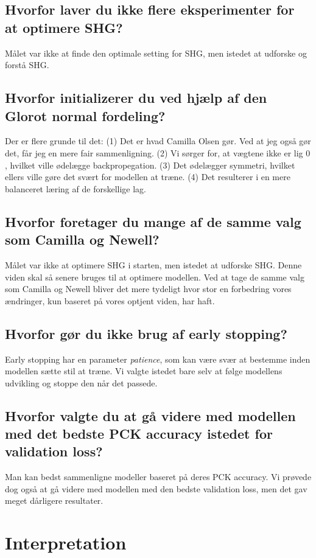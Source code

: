 \documentclass[a4paper]{article}
\begin{document}
\subsection{Hvorfor laver du ikke flere eksperimenter for at optimere SHG?}
Målet var ikke at finde den optimale setting for SHG, men istedet at udforske og forstå SHG. 

\subsection{Hvorfor initializerer du ved hjælp af den Glorot normal fordeling?}
Der er flere grunde til det: (1) Det er hvad Camilla Olsen gør. Ved at jeg også gør det, får jeg en mere fair sammenligning. (2) Vi sørger for, at vægtene ikke er lig $0$, hvilket ville ødelægge backpropegation. (3) Det ødelægger symmetri, hvilket ellers ville gøre det svært for modellen at træne. (4) Det resulterer i en mere balanceret læring af de forskellige lag.

\subsection{Hvorfor foretager du mange af de samme valg som Camilla og Newell?}
Målet var ikke at optimere SHG i starten, men istedet at udforske SHG. Denne viden skal så senere bruges til at optimere modellen. Ved at tage de samme valg som Camilla og Newell bliver det mere tydeligt hvor stor en forbedring vores ændringer, kun baseret på vores optjent viden, har haft.

\subsection{Hvorfor gør du ikke brug af early stopping?}
Early stopping har en parameter \textit{patience}, som kan være svær at bestemme inden modellen sætte stil at træne. Vi valgte istedet bare selv at følge modellens udvikling og stoppe den når det passede.

\subsection{Hvorfor valgte du at gå videre med modellen med det bedste PCK accuracy istedet for validation loss?}
Man kan bedst sammenligne modeller baseret på deres PCK accuracy. Vi prøvede dog også at gå videre med modellen med den bedste validation loss, men det gav meget dårligere resultater.

\section{Interpretation}
\end{document}
